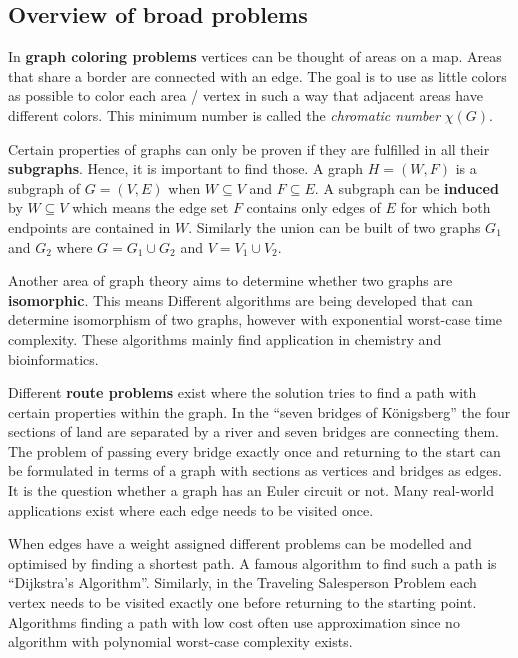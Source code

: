 \documentclass[final]{fhnwreport}       %
\begin{document}
\subsection{Overview of broad problems}

In \textbf{graph coloring problems} vertices can be thought of areas on a map. Areas that share a border are connected with an edge. The goal is to use as little colors as possible to color each area / vertex in such a way that adjacent areas have different colors. This minimum number is called the \textit{chromatic number} $\chi(G)$. 

Certain properties of graphs can only be proven if they are fulfilled in all their \textbf{subgraphs}. Hence, it is important to find those. A graph $H = (W, F)$ is a subgraph of $G = (V, E)$ when $W \subseteq V$ and $F \subseteq E$. A subgraph can be \textbf{induced} by $W \subseteq V$ which means the edge set $F$ contains only edges of $E$ for which both endpoints are contained in $W$. Similarly the union can be built of two graphs $G_1$ and $G_2$ where $G = G_1 \cup G_2$ and $V = V_1 \cup V_2$. 

Another area of graph theory aims to determine whether two graphs are \textbf{isomorphic}. This means  Different algorithms are being developed that can determine isomorphism of two graphs, however with exponential worst-case time complexity. These algorithms mainly find application in chemistry and bioinformatics.  

Different \textbf{route problems} exist where the solution tries to find a path with certain properties within the graph. In the ``seven bridges of Königsberg'' the four sections of land are separated by a river and seven bridges are connecting them. The problem of passing every bridge exactly once and returning to the start can be formulated in terms of a graph with sections as vertices and bridges as edges. It is the question whether a graph has an Euler circuit or not. Many real-world applications exist where each edge needs to be visited once.

When edges have a weight assigned different problems can be modelled and optimised by finding a shortest path. A famous algorithm to find such a path is ``Dijkstra’s Algorithm''. Similarly, in the Traveling Salesperson Problem each vertex needs to be visited exactly one before returning to the starting point. Algorithms finding a path with low cost often use approximation since no algorithm with polynomial worst-case complexity exists. 
\end{document}
